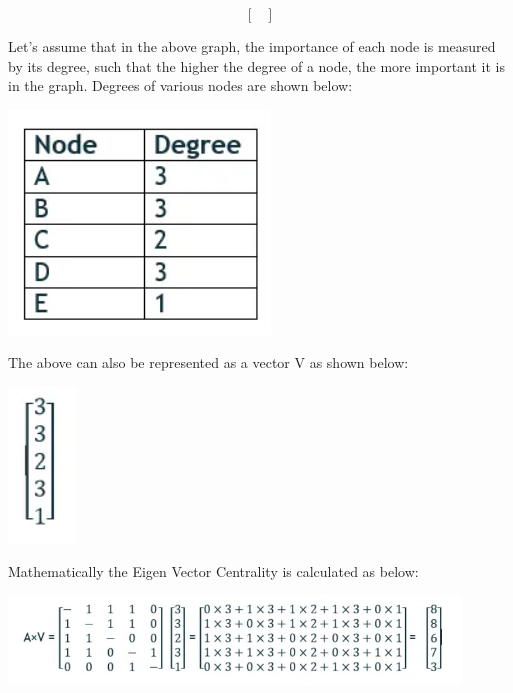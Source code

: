 \documentclass[12pt, a4paper]{report}
\begin{document}
\begin{itemize}
\begin{equation*}
\begin{bmatrix}
    \end{bmatrix}
    \end{equation*}
    
    Let’s assume that in the above graph, the importance of each node is measured by its degree, such that the higher the degree of a node, the more important it is in the graph. Degrees of various nodes are shown below:

    \includegraphics[center]{Table}
    
    
    The above can also be represented as a vector V as shown below:

    \includegraphics[center]{Vector}

    Mathematically the Eigen Vector Centrality is calculated as below:

    \includegraphics[width=0.9\textwidth,center]{Multiplication}


\end{itemize}
\end{document}
